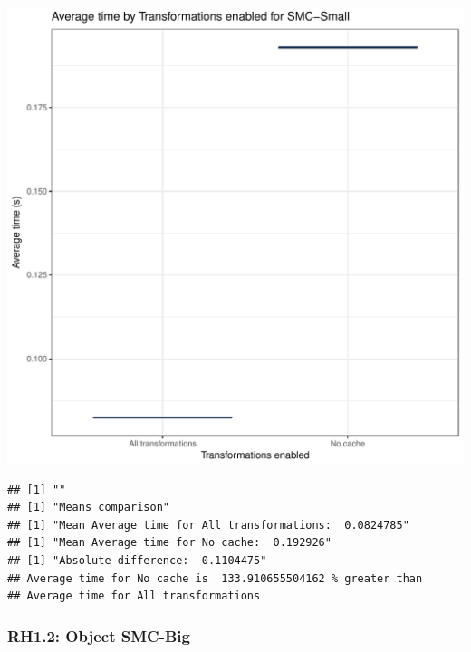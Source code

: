 \documentclass{article}\usepackage[]{graphicx}\usepackage[]{color}
\makeatletter
\def\maxwidth{ %
  \ifdim\Gin@nat@width>\linewidth
    \linewidth
  \else
    \Gin@nat@width
  \fi
}
\newenvironment{kframe}{%
 \def\at@end@of@kframe{}%
 \ifinner\ifhmode%
  \def\at@end@of@kframe{\end{minipage}}%
  \begin{minipage}{\columnwidth}%
 \fi\fi%
 \def\FrameCommand##1{\hskip\@totalleftmargin \hskip-\fboxsep
 \colorbox{shadecolor}{##1}\hskip-\fboxsep
     \hskip-\linewidth \hskip-\@totalleftmargin \hskip\columnwidth}%
 \MakeFramed {\advance\hsize-\width
   \@totalleftmargin\z@ \linewidth\hsize
   \@setminipage}}%
 {\par\unskip\endMakeFramed%
 \at@end@of@kframe}
\newenvironment{knitrout}{}{} %
\makeatother
\begin{document}
\begin{knitrout}
\color{fgcolor}
\includegraphics[width=\maxwidth]{figure/RH1_small-1} 
\begin{kframe}

{\ttfamily\noindent\bfseries\color{errorcolor}{\#\# Error in eval(expr, envir, enclos): object 'shap\_cashew\_small' not found}}\begin{verbatim}
## [1] ""
## [1] "Means comparison"
## [1] "Mean Average time for All transformations:  0.0824785"
## [1] "Mean Average time for No cache:  0.192926"
## [1] "Absolute difference:  0.1104475"
## Average time for No cache is  133.910655504162 % greater than 
## Average time for All transformations
\end{verbatim}
\end{kframe}
\end{knitrout}


\subsubsection{RH1.2: Object SMC-Big}
\end{document}
